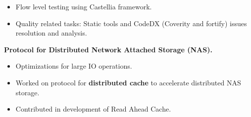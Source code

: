 \begin{itemize}
\begin{itemize}
	 \item Flow level testing using Castellia framework.\\[-0.5cm]
	 \item Quality related tasks: Static tools and CodeDX (Coverity and fortify) issues resolution and analysis.\\[-0.5cm]
	\end{itemize}
	\textbf{Protocol for Distributed Network Attached Storage (NAS).}\\[-0.6cm]
	\begin{itemize}
	\item Optimizations for large IO operations.\\[-0.5cm]
	\item Worked on protocol for \textbf{distributed cache} to accelerate distributed NAS storage.\\[-0.5cm]
	\item Contributed in development of Read Ahead Cache.
	\end{itemize}
\end{itemize}
